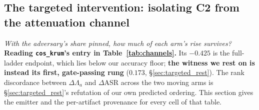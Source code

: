 \documentclass{article}
\begin{document}
\subsection{The targeted intervention: isolating C2 from the attenuation channel}
\label{app:targeted_full}
\label{app:channel_table}

\noindent \emph{With the adversary's share pinned, how much of each arm's rise survives?}
\textbf{Reading \texttt{cos\_krum}'s entry in Table~\ref{tab:channels}.} Its $-0.425$ is the full-ladder endpoint, which lies below our accuracy floor; \textbf{the witness we rest on is instead its first, gate-passing rung} ($0.173$, §\ref{sec:targeted_rest}). The rank discordance between $\Delta\Lambda_a$ and $\Delta$ASR across the two moving arms is §\ref{sec:targeted_rest}'s refutation of our own predicted ordering. This section gives the emitter and the per-artifact provenance for every cell of that table.
\end{document}
